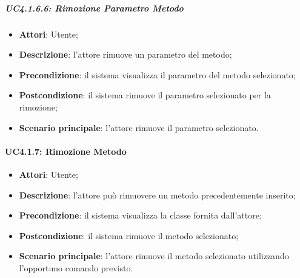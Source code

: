 \subparagraph{UC4.1.6.6: Rimozione Parametro Metodo}
\label{UC4.1.6.6}
\begin{itemize}
	\item \textbf{Attori}: Utente;
	\item \textbf{Descrizione}: l'attore rimuove un parametro del metodo;
	\item \textbf{Precondizione}: il sistema visualizza il parametro del metodo selezionato;
	\item \textbf{Postcondizione}: il sistema rimuove il parametro selezionato per la rimozione;
	\item \textbf{Scenario principale}: l'attore rimuove il parametro selezionato.
\end{itemize}

\paragraph{UC4.1.7: Rimozione Metodo}
\label{UC4.1.7}
\begin{itemize}
	\item \textbf{Attori}: Utente;
	\item \textbf{Descrizione}: l'attore può rimuovere un metodo precedentemente inserito;
	\item \textbf{Precondizione}: il sistema visualizza la classe fornita dall'attore;
	\item \textbf{Postcondizione}: il sistema rimuove il metodo selezionato;
	\item \textbf{Scenario principale}: l'attore rimuove il metodo selezionato utilizzando l'opportuno comando previsto.
\end{itemize}

